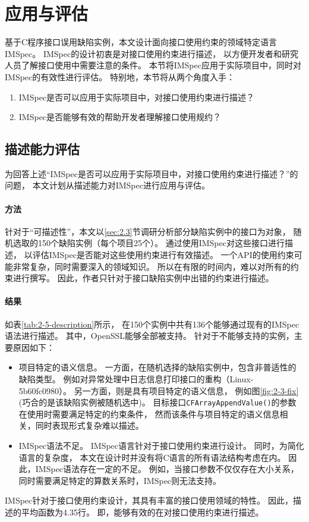 \section{应用与评估}
\label{sec:2.5}
基于C程序接口误用缺陷实例，本文设计面向接口使用约束的领域特定语言IMSpec。
IMSpec的设计初衷是对接口使用约束进行描述，
以方便开发者和研究人员了解接口使用中需要注意的条件。
本节将IMSpec应用于实际项目中，同时对IMSpec的有效性进行评估。
特别地，本节将从两个角度入手：
\begin{enumerate}
	\item IMSpec是否可以应用于实际项目中，对接口使用约束进行描述？
	\item IMSpec是否能够有效的帮助开发者理解接口使用规约？
\end{enumerate}


\subsection{描述能力评估}
为回答上述“IMSpec是否可以应用于实际项目中，对接口使用约束进行描述？”的问题，
本文计划从描述能力对IMSpec进行应用与评估。

\paragraph{方法}
针对于“可描述性”，本文以\ref{sec:2.3}节调研分析部分缺陷实例中的接口为对象，
随机选取的150个缺陷实例（每个项目25个）。
通过使用IMSpec对这些接口进行描述，
以评估IMSpec是否能对这些使用约束进行有效描述。
一个API的使用约束可能非常复杂，同时需要深入的领域知识。
所以在有限的时间内，难以对所有的约束进行撰写。
因此，作者只针对于接口缺陷实例中出错的约束进行描述。

\paragraph{结果}

如表\ref{tab:2-5-description}所示，
在150个实例中共有136个能够通过现有的IMSpec语法进行描述。
其中，OpenSSL能够全部被支持。
针对于不能够支持的实例，主要原因如下：
\begin{itemize}
	\item 项目特定的语义信息。
	一方面，在随机选择的缺陷实例中，包含非普适性的缺陷类型。
	例如对异常处理中日志信息打印接口的重构（Linux-5b60fc0980）。
	另一方面，则是具有项目特定的语义信息，
	例如图\ref{fig:2-3-fix}(巧合的是该缺陷实例被随机选中)。
	目标接口\texttt{CFArrayAppendValue()}的参数在使用时需要满足特定的约束条件，
	然而该条件与项目特定的语义信息相关，同时表现形式复杂难以描述。
	\item IMSpec语法不足。
	IMSpec语言针对于接口使用约束进行设计。
	同时，为简化语言的复杂度，
	本文在设计时并没有将C语言的所有语法结构考虑在内。
	因此，IMSpec语法存在一定的不足。
	例如，当接口参数不仅仅存在大小关系，
	同时需要满足特定的算数关系时，IMSpec则无法支持。
\end{itemize}
IMSpec针对于接口使用约束设计，其具有丰富的接口使用领域的特性。
因此，描述的平均函数为4.35行。
即，能够有效的在对接口使用约束进行描述。

